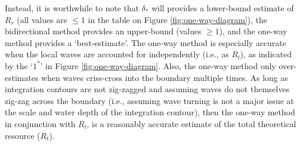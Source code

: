 Instead, it is worthwhile to note that $\delta_*$ will provides a lower-bound estimate of $R_r$ (all values are $\le 1$ in the table on Figure \ref{fig:one-way-diagram}), the bidirectional method provides an upper-bound (values $\ge 1$), and the one-way method provides a `best-estimate'. The one-way method is especially accurate when the local waves are accounted for independently (i.e., as $R_l$), as indicated by the `$1^*$' in Figure \ref{fig:one-way-diagram}. Also, the one-way method only over-estimates when waves criss-cross into the boundary multiple times. As long as integration contours are not zig-zagged and assuming waves do not themselves zig-zag across the boundary (i.e., assuming wave turning is not a major issue at the scale and water depth of the integration contour), then the one-way method in conjunction with $R_l$, is a reasonably accurate estimate of the total theoretical resource ($R_t$).




